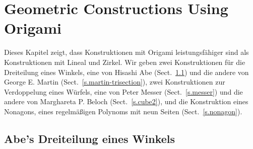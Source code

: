 
\chapter{Geometric Constructions Using Origami}\label{c.origami-constructions}



Dieses Kapitel zeigt, dass Konstruktionen mit Origami leistungsfähiger sind als Konstruktionen mit Lineal und Zirkel. Wir geben zwei Konstruktionen für die Dreiteilung eines Winkels, eine von Hisashi Abe (Sect.~\ref{s.abe-trisection}) und die andere von George E. Martin (Sect.~\ref{s.martin-trisection}), zwei Konstruktionen zur Verdoppelung eines Würfels, eine von Peter Messer (Sect.~\ref{s.messer}) und die andere von Marghareta P. Beloch (Sect.~\ref{s.cube2}), und die Konstruktion eines Nonagons, eines regelmäßigen Polynoms mit neun Seiten (Sect.~\ref{s.nonagon}).

\section{Abe's Dreiteilung eines Winkels}\label{s.abe-trisection}



